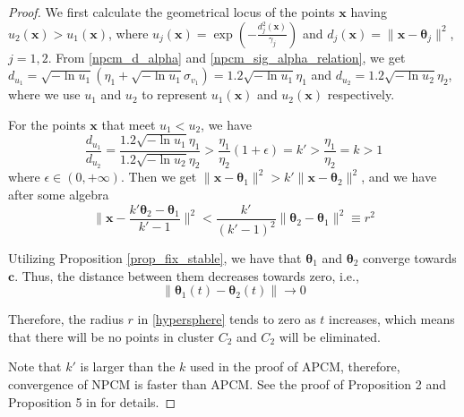 \documentclass[conference]{IEEEtran}
\theoremstyle{definition}
\newtheorem*{proof}{Proof}
\begin{document}
\begin{proof}
 We first calculate the geometrical locus of the points $\mathbf{x}$ having $u_2(\mathbf{x})>u_1(\mathbf{x})$, where $u_j(\mathbf{x})=\exp\left(-\frac{d_j^2(\mathbf{x})}{\gamma_j}\right)$ and $d_j(\mathbf{x})=\|\mathbf{x} - \boldsymbol{\theta}_j\|^2$, $j=1,2$.
From \eqref{npcm_d_alpha} and \eqref{npcm_sig_alpha_relation}, we get $d_{u_1}=\sqrt{-\ln u_1}\left(\eta_1+\sqrt{-\ln u_1}\sigma_{v_1}\right)=1.2\sqrt{-\ln u_1}\eta_1$ and $d_{u_2}=1.2\sqrt{-\ln u_2}\eta_2$, where we use $u_1$ and $u_2$ to represent $u_1(\mathbf{x})$ and $u_2(\mathbf{x})$ respectively.

For the points $\mathbf{x}$ that meet $u_1<u_2$, we have
\begin{equation*}
\frac{d_{u_1}}{d_{u_2}}=\frac{1.2\sqrt{-\ln u_1}\eta_1}{1.2\sqrt{-\ln u_2}\eta_2}>\frac{\eta_1}{\eta_2}(1+\epsilon)=k'>\frac{\eta_1}{\eta_2}=k>1
\end{equation*}
where $\epsilon\in(0,+\infty)$. Then we get $\|\mathbf{x} - \boldsymbol{\theta}_1\|^2 > k'\|\mathbf{x} - \boldsymbol{\theta}_2\|^2$, and we have after some algebra
\begin{equation}
\label{hypersphere}
\|\mathbf{x}-\frac{k'\boldsymbol{\theta}_2-\boldsymbol{\theta}_1}{k'-1}\|^2 < \frac{k'}{(k'-1)^2}\|\boldsymbol{\theta}_2-\boldsymbol{\theta}_1\|^2\equiv r^2
\end{equation}

Utilizing Proposition \ref{prop_fix_stable}, we have that $\boldsymbol{\theta}_1$ and $\boldsymbol{\theta}_2$ converge towards $\mathbf{c}$. Thus, the distance between them decreases towards zero, i.e.,
\begin{equation}
\|\boldsymbol{\theta}_1(t)-\boldsymbol{\theta}_2(t)\|\rightarrow 0
\label{eqprop51}
\end{equation}

Therefore, the radius $r$ in \eqref{hypersphere} tends to zero as $t$ increases, which means that there will be no points in cluster $C_2$ and $C_2$ will be eliminated.

Note that $k'$ is larger than the $k$ used in the proof of APCM, therefore, convergence of NPCM is faster than APCM.
See the proof of Proposition 2 and Proposition 5 in \cite{xenaki_novel_2016} for details.
\end{proof}






\end{document}
